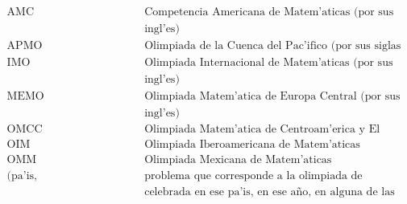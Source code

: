 $$
\begin{array}{lcl}
\mbox{AMC} & \hspace{1in} & \mbox{Competencia Americana de 
Matem'aticas (por sus siglas en}\\ 
& \hspace{1in} &  \mbox{ingl'es)}\\
\mbox{APMO} & \hspace{1in} & \mbox{Olimpiada de la Cuenca del Pac'ifico (por
sus siglas en ingl'es)}\\
\mbox{IMO} & \hspace{1in} & \mbox{Olimpiada Internacional de 
Matem'aticas (por sus siglas en}\\ 
& \hspace{1in} & \mbox{ingl'es)}\\
\mbox{MEMO} & \hspace{1in} & \mbox{Olimpiada Matem'atica de 
Europa Central (por sus siglas en}\\ 
& \hspace{1in} & \mbox{ingl'es) }\\
\mbox{OMCC} & \hspace{1in} & \mbox{Olimpiada Matem'atica de Centroam'erica y El Caribe }\\
\mbox{OIM} & \hspace{1in} & \mbox{Olimpiada Iberoamericana de Matem'aticas }\\
\mbox{OMM} & \hspace{1in} & \mbox{Olimpiada Mexicana de Matem'aticas }\\
\mbox{(pa'is, a\~no)} & \hspace{1in} & \mbox{problema que corresponde a la 
olimpiada de matem'aticas}\\ 
& \hspace{1in} & \mbox{celebrada en ese pa'is, en ese a\~no, en alguna de las
etapas} 
\end{array}
$$
